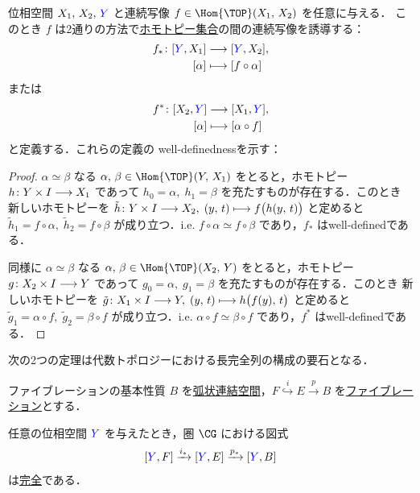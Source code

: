 \documentclass[algtopo_main]{subfiles}
\begin{document}
位相空間 $X_1,\, X_2,\, \textcolor{blue}{Y}$ と連続写像 $f \in \Hom{\TOP}(X_1,\, X_2)$ を任意に与える．
このとき $f$ は2通りの方法で\hyperref[def:homotopy-set]{ホモトピー集合}の間の連続写像を誘導する：
\begin{align}
    f_* \colon \comm{\textcolor{blue}{Y}}{X_1} &\lto \comm{\textcolor{blue}{Y}}{X_2}, \\
    [\alpha] &\lmto [f \circ \alpha]
\end{align}
または
\begin{align}
    f^* \colon \comm{X_2}{\textcolor{blue}{Y}} &\lto \comm{X_1}{\textcolor{blue}{Y}}, \\
    [\alpha] &\lmto [\alpha \circ f]
\end{align}
と定義する．これらの定義の
well-definednessを示す：
\begin{proof}
$\alpha \simeq \beta$ なる $\alpha,\, \beta \in \Hom{\TOP} (Y,\, X_1)$ をとると，ホモトピー $h \colon Y \times I \longrightarrow X_1$ であって $h_0 = \alpha,\; h_1 = \beta$ を充たすものが存在する．このとき
新しいホモトピーを $\tilde{h} \colon Y \times I \longrightarrow X_2,\; (y,\, t) \longmapsto f \bigl( h(y,\, t)\bigr)$ と定めると $\tilde{h}_1 = f \circ \alpha,\; \tilde{h}_2 = f \circ \beta$ が成り立つ．i.e. $f \circ \alpha \simeq f \circ \beta$ であり，$f_*$ はwell-definedである．

同様に $\alpha \simeq \beta$ なる $\alpha,\, \beta \in \Hom{\TOP} (X_2,\, Y)$ をとると，ホモトピー $g \colon X_2 \times I \longrightarrow Y$ であって $g_0 = \alpha,\; g_1 = \beta$ を充たすものが存在する．このとき
新しいホモトピーを $\tilde{g} \colon X_1 \times I \longrightarrow Y,\; (y,\, t) \longmapsto h\bigl(f(y),\, t\bigr)$ と定めると $\tilde{g}_1 = \alpha \circ f,\; \tilde{g}_2 = \beta \circ f$ が成り立つ．i.e. $\alpha \circ f \simeq \beta \circ f$ であり，$f^*$ はwell-definedである．
\end{proof}

次の2つの定理は代数トポロジーにおける長完全列の構成の要石となる．

\begin{mytheo}[label=thm:fib-basic]{ファイブレーションの基本性質}
    $B$ を\underline{弧状連結空間}，$F \stackrel{i}{\hookrightarrow} E \xrightarrow{p} B$ を\hyperref[def:fibration]{ファイブレーション}とする．
    
    任意の位相空間 $\textcolor{blue}{Y}$ を与えたとき，圏 $\CG$ における図式
    \begin{align}
        \comm{\textcolor{blue}{Y}}{F} \xrightarrow{i_*} \comm{\textcolor{blue}{Y}}{E} \xrightarrow{p_*} \comm{\textcolor{blue}{Y}}{B}
    \end{align}
    は\hyperref[def:ES-SETS]{完全}である．
\end{mytheo}
\end{document}
